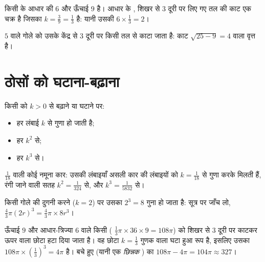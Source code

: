 \begin{example}\label{ex:g9:solids:section}
किसी  के आधार की  $6$ और ऊँचाई $9$ है। आधार के ,
शिखर से $3$ दूरी पर लिए गए तल की काट एक चक्र है जिसका 
$k = \frac39 = \frac13$ है: यानी उसकी  $6 \times \frac13 = 2$।

$5$  वाले गोले को उसके केंद्र से $3$ दूरी पर किसी तल से काटा
जाता है: काट $\sqrt{25 - 9} = 4$  वाला वृत्त है।
\end{example}

\section{ठोसों को घटाना-बढ़ाना}

\begin{theorem}\label{thm:g9:solids:scaling}
किसी  को  $k > 0$ से बढ़ाने या घटाने पर:
\begin{itemize}
  \item हर लंबाई $k$ से गुणा हो जाती है;
  \item हर  $k^2$ से;
  \item हर  $k^3$ से।
\end{itemize}
\end{theorem}
\admitted

\begin{example}\label{ex:g9:solids:scaling}
$\frac{1}{18}$  वाली कोई नमूना कार: उसकी लंबाइयाँ असली कार की
लंबाइयों को $k = \frac{1}{18}$ से गुणा करके मिलती हैं, रंगी जाने वाली
सतह $k^2 = \frac{1}{324}$ से, और  $k^3 = \frac{1}{5832}$ से।

किसी गोले की  दुगनी करने ($k = 2$) पर उसका  $2^3 = 8$
गुना हो जाता है: सूत्र पर जाँच लो,
$\frac43\pi (2r)^3 = \frac43 \pi \times 8r^3$।
\end{example}

\begin{example}[छिन्नक शंकु]\label{ex:g9:solids:truncated}
ऊँचाई $9$ और आधार-त्रिज्या $6$ वाले किसी  (
$\frac13 \pi \times 36 \times 9 = 108\pi$) को शिखर से $3$ दूरी पर
काटकर ऊपर वाला छोटा  हटा दिया जाता है। वह छोटा 
$k = \frac13$ गुणक वाला घटा हुआ रूप है, इसलिए उसका 
$108\pi \times \left(\frac13\right)^3 = 4\pi$ है। बचे हुए  (यानी
एक \emph{छिन्नक }) का  $108\pi - 4\pi = 104\pi \approx 327$।
\end{example}

